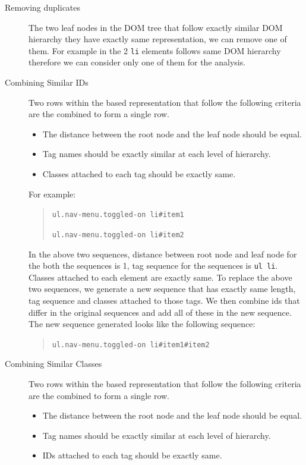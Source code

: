 		\begin{description}
			\item[Removing duplicates]
			The two leaf nodes in the DOM tree that follow exactly similar DOM hierarchy \ie they have exactly same \css representation, we can remove one of them. For example in  the 2 \texttt{li} elements follows same DOM hierarchy therefore we can consider only one of them for the analysis.
		
			\item[Combining Similar IDs]
			Two rows within the \css based representation that follow the following criteria are the combined to form a single row. 

			\begin{itemize}
				\item The distance between the root node and the leaf node should be equal.
				\item Tag names should be exactly similar at each level of hierarchy.
				\item Classes attached to each tag should be exactly same.
			\end{itemize}

			For example:
			
			\begin{quote}
				\texttt{ul.nav-menu.toggled-on li\#item1}
	
				\texttt{ul.nav-menu.toggled-on li\#item2}
			\end{quote}

			In the above two sequences, distance between root node and leaf node for the both the sequences is 1, tag sequence for the sequences is \texttt{ul li}. Classes attached to each element are exactly same. To replace the above two sequences, we generate a new sequence that has exactly same length, tag sequence and classes attached to those tags. We then combine ids that differ in the original sequences and add all of these in the new sequence. The new sequence generated looks like the following sequence:

			\begin{quote}
				\texttt{ul.nav-menu.toggled-on li\#item1\#item2}
			\end{quote}


			\item[Combining Similar Classes]
			Two rows within the \css based representation that follow the following criteria are the combined to form a single row. 
			
			\begin{itemize}
				\item The distance between the root node and the leaf node should be equal.
				\item Tag names should be exactly similar at each level of hierarchy.
				\item IDs attached to each tag should be exactly same.
			\end{itemize}


\end{description}
